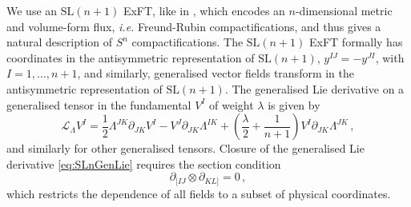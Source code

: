 \documentclass[a4paper, 11pt]{article}
\numberwithin{equation}{section}
\newcommand{\SL}[1]{\mathrm{SL}( #1 )}
\newcommand{\+}{\oplus}
\newcommand{\gL}{\mathcal{L}}
\begin{document}
We use an $\SL{n+1}$ ExFT, like in \cite{Lee:2014mla}, which encodes an $n$-dimensional metric and volume-form flux, \textit{i.e.} Freund-Rubin compactifications, and thus gives a natural description of $S^n$ compactifications. The $\SL{n+1}$ ExFT formally has coordinates in the antisymmetric representation of $\SL{n+1}$, $y^{IJ} = - y^{JI}$, with $I = 1, \ldots, n+1$, and similarly, generalised vector fields transform in the antisymmetric representation of $\SL{n+1}$. The generalised Lie derivative on a generalised tensor in the fundamental $V^I$ of weight $\lambda$ is given by
\begin{equation} \label{eq:SLnGenLie}
	\gL_\Lambda V^I = \frac12 \Lambda^{JK} \partial_{JK} V^{I} - V^J \partial_{JK} \Lambda^{IK} + \left( \frac{\lambda}{2} + \frac{1}{n+1} \right) V^I \partial_{JK} \Lambda^{JK} \,,
\end{equation}
and similarly for other generalised tensors. Closure of the generalised Lie derivative \eqref{eq:SLnGenLie} requires the section condition
\begin{equation} \label{eq:SLnSC}
	\partial_{[IJ} \otimes \partial_{KL]} = 0 \,,
\end{equation}
which restricts the dependence of all fields to a subset of physical coordinates.
\end{document}
